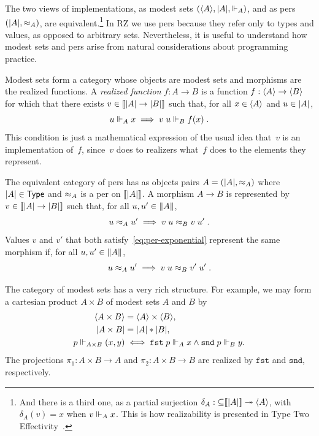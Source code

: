 The two views of implementations, as modest sets $(\langle A \rangle,
|A|, {\Vdash_A})$, and as pers $(|A|, {\approx_A})$, are
equivalent.\footnote{And there is a third one, as a partial surjection
  $\delta_A : {\subseteq}[\![|A|]\!] \twoheadrightarrow \langle A \rangle$, with
  $\delta_A(v) = x$ when $v \Vdash_A x$. This is how realizability is
  presented in Type Two Effectivity~\cite{Wei00}.} In RZ we use pers
because they refer only to types and values, as opposed to arbitrary
sets. Nevertheless, it is useful to understand how modest sets and
pers arise from natural considerations about programming practice.

Modest sets form a category whose objects are modest sets and
morphisms are the realized functions. A \emph{realized function} $f :
A \to B$ is a function $f : \langle A \rangle \to \langle B \rangle$ for which that there
exists $v \in [\![|A| \to |B|]\!]$ such that, for all
$x \in \langle A \rangle$ and $u \in |A|$,
%
\begin{equation}
  \label{eq:rz-function-space}
  u \Vdash_A x \implies v\;u \Vdash_B f(x) \;.
\end{equation}
%
This condition is just a mathematical expression of the usual idea
that~$v$ is an implementation of~$f$, since~$v$ does to realizers
what~$f$ does to the elements they represent.

The equivalent category of pers has as objects pairs $A = (|A|,
{\approx_A})$ where $|A| \in \mathsf{Type}$ and $\approx_A$ is a per on
$[\![|A|]\!]$. A morphism $A \to B$ is represented by $v
\in [\![|A| \to |B|]\!]$ such that, for all $u, u'
\in \|A\|$,
%
\begin{equation}
  \label{eq:per-exponential}
  u \approx_A u' \implies v\;u \approx_B v\;u' \;.
\end{equation}
%
Values $v$ and $v'$ that both satisfy~\eqref{eq:per-exponential}
represent the same morphism if, for all $u, u' \in \|A\|$,
%
\begin{equation*}
  u \approx_A u' \implies v\;u \approx_B v'\;u' \;.
\end{equation*}

The category of modest sets has a very rich structure. For example, we
may form a cartesian product $A \times B$ of modest sets $A$ and $B$
by
%
\begin{align*}
  \langle A \times B \rangle &= \langle A \rangle \times \langle B \rangle,\\
  |A \times B| &= |A| * |B|,\\
  p \Vdash_{A \times B} (x,y) &\iff
  \mathtt{fst}\;p \Vdash_A x \land \mathtt{snd}\;p \Vdash_B y.
\end{align*}
%
The projections $\pi_1 : A \times B \to A$ and $\pi_2 : A \times B \to
B$ are realized by $\mathtt{fst}$ and $\mathtt{snd}$, respectively.


